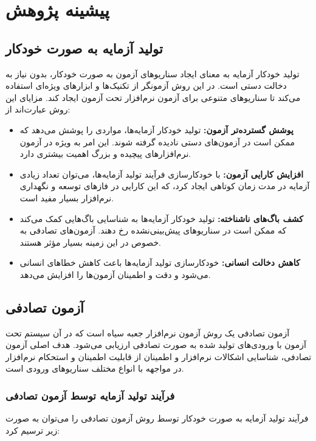 \chapter{پیشینه پژوهش}
\section{تولید آزمایه به صورت خودکار}
تولید خودکار آزمایه 
به معنای ایجاد سناریوهای آزمون به صورت خودکار، بدون نیاز به دخالت دستی است. در این روش آزمونگر از تکنیک‌ها و ابزارهای ویژه‌ای استفاده می‌کند تا سناریوهای متنوعی برای آزمون نرم‌افزار تحت آزمون
 ایجاد کند. مزایای این روش عبارت‌اند از:
\begin{itemize}
	\item \textbf{پوشش گسترده‌تر آزمون:} تولید خودکار آزمایه‌ها، مواردی را پوشش می‌دهد که ممکن است در آزمون‌های دستی نادیده گرفته شوند. این امر به ویژه در آزمون نرم‌افزارهای پیچیده و بزرگ اهمیت بیشتری دارد.
	\item \textbf{افزایش کارایی آزمون:} با خودکارسازی فرآیند تولید آزمایه‌ها، می‌توان تعداد زیادی آزمایه در مدت زمان کوتاهی ایجاد کرد، که این کارایی در فازهای توسعه و نگهداری نرم‌افزار بسیار مفید است.
	\item \textbf{کشف باگ‌های ناشناخته:} تولید خودکار آزمایه‌ها به شناسایی باگ‌هایی کمک می‌کند که ممکن است در سناریوهای پیش‌بینی‌نشده رخ دهند. آزمون‌های تصادفی به خصوص در این زمینه بسیار مؤثر هستند.
	\item \textbf{کاهش دخالت انسانی:} خودکارسازی تولید آزمایه‌ها باعث کاهش خطاهای انسانی می‌شود و دقت و اطمینان آزمون‌ها را افزایش می‌دهد.
\end{itemize}

\section{آزمون تصادفی}
آزمون تصادفی  یک روش آزمون نرم‌افزار جعبه سیاه است که در آن سیستم تحت آزمون با ورودی‌های تولید شده به صورت تصادفی ارزیابی می‌شود. هدف اصلی آزمون تصادفی، شناسایی اشکالات نرم‌افزار و اطمینان از قابلیت اطمینان و استحکام نرم‌افزار در مواجهه با انواع مختلف سناریوهای ورودی است.
\subsection{فرآیند تولید آزمایه توسط آزمون تصادفی}
فرآیند تولید آزمایه به صورت خودکار توسط روش آزمون تصادفی را می‌توان به صورت زیر ترسیم کرد:

